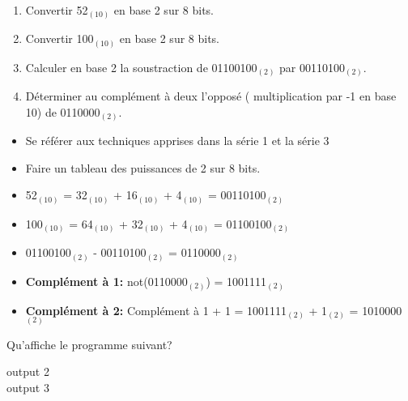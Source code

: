 \begin{Exercice}[10 minutes]\\
    \begin{enumerate}
        \item Convertir 52$_{(10)}$ en base 2 sur 8 bits.
        \item Convertir 100$_{(10)}$ en base 2 sur 8 bits.
        \item Calculer en base 2 la soustraction de 01100100$_{(2)}$ par 00110100$_{(2)}$.
        \item Déterminer au complément à deux l'opposé ( multiplication par -1 en base 10) de 0110000$_{(2)}$.
    \end{enumerate}
\begin{conseil}
   \begin{itemize}
       \item Se référer aux techniques apprises dans la série 1 et la série 3
       \item Faire un tableau des puissances de 2 sur 8 bits.
   \end{itemize}
\end{conseil}
    
\begin{solution}
\begin{itemize}
    \item 52$_{(10)}$ = 32$_{(10)}$ + 16$_{(10)}$ + 4$_{(10)}$ = 00110100$_{(2)}$
    \item 100$_{(10)}$ = 64$_{(10)}$ + 32$_{(10)}$ + 4$_{(10)}$ = 01100100$_{(2)}$
    \item 01100100$_{(2)}$ - 00110100$_{(2)}$ = 0110000$_{(2)}$
    \item \textbf{Complément à 1:} not(0110000$_{(2)}$) = 1001111$_{(2)}$ 
    \item \textbf{Complément à 2:} Complément à 1 + 1 = 1001111$_{(2)}$ + 1$_{(2)}$ = 1010000$_{(2)}$
\end{itemize}   
\end{solution}

\end{Exercice}

\begin{Exercice}[5 minutes]
    Qu'affiche le programme suivant?
    

    \begin{solution}
        output 2 \\
        output 3
    \end{solution}
\end{Exercice}

